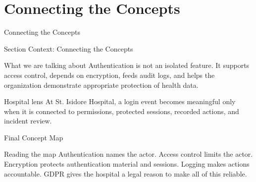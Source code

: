 \documentclass[presentation]{beamer}
\newcommand{\sectiontitleframe}[1]{
\begin{frame}[plain,c]
\begin{center}
{\usebeamerfont{title}\usebeamercolor[fg]{title}#1}
\end{center}
\end{frame}
}
\newcommand{\scenario}{St. Isidore Hospital}
\begin{document}
\section{Connecting the Concepts}
\sectiontitleframe{Connecting the Concepts}

\begin{frame}[c]{Section Context: Connecting the Concepts}
\begin{block}{What we are talking about}
Authentication is not an isolated feature. It supports access control, depends on encryption, feeds
audit logs, and helps the organization demonstrate appropriate protection of health data.
\end{block}

\begin{exampleblock}{Hospital lens}
At \scenario, a login event becomes meaningful only when it is connected to permissions, protected
sessions, recorded actions, and incident review.
\end{exampleblock}
\end{frame}

\begin{frame}[c]{Final Concept Map}
  \begin{center}
  \end{center}

  \vspace{0.35cm}
  \begin{block}{Reading the map}
    Authentication names the actor. Access control limits the actor. Encryption protects authentication material and sessions. Logging makes actions accountable. GDPR gives the hospital a legal reason to make all of this reliable.
  \end{block}
\end{frame}
\end{document}
